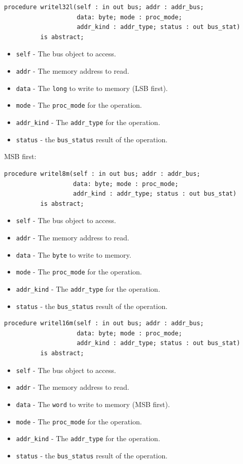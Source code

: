 \documentclass[10pt, openany]{book}
\newcommand{\keyword}[1]{\texttt{#1}}
\newcommand{\datatype}[1]{\texttt{#1}}
\begin{document}
\begin{lstlisting}
procedure writel32l(self : in out bus; addr : addr_bus;
                    data: byte; mode : proc_mode;
                    addr_kind : addr_type; status : out bus_stat)
          is abstract;
\end{lstlisting}
\begin{itemize}
  \item \keyword{self} - The bus object to access.
  \item \keyword{addr} - The memory address to read.
  \item \keyword{data} - The \datatype{long} to write to memory (LSB first).
  \item \keyword{mode} - The \datatype{proc\_mode} for the operation.
  \item \keyword{addr\_kind} - The \datatype{addr\_type} for the operation.
  \item \keyword{status} - the \datatype{bus\_status} result of the operation.
\end{itemize}

MSB first:
\begin{lstlisting}
procedure writel8m(self : in out bus; addr : addr_bus;
                   data: byte; mode : proc_mode;
                   addr_kind : addr_type; status : out bus_stat)
          is abstract;
\end{lstlisting}
\begin{itemize}
  \item \keyword{self} - The bus object to access.
  \item \keyword{addr} - The memory address to read.
  \item \keyword{data} - The \datatype{byte} to write to memory.
  \item \keyword{mode} - The \datatype{proc\_mode} for the operation.
  \item \keyword{addr\_kind} - The \datatype{addr\_type} for the operation.
  \item \keyword{status} - the \datatype{bus\_status} result of the operation.
\end{itemize}

\begin{lstlisting}
procedure writel16m(self : in out bus; addr : addr_bus;
                    data: byte; mode : proc_mode;
                    addr_kind : addr_type; status : out bus_stat)
          is abstract;
\end{lstlisting}
\begin{itemize}
  \item \keyword{self} - The bus object to access.
  \item \keyword{addr} - The memory address to read.
  \item \keyword{data} - The \datatype{word} to write to memory (MSB first).
  \item \keyword{mode} - The \datatype{proc\_mode} for the operation.
  \item \keyword{addr\_kind} - The \datatype{addr\_type} for the operation.
  \item \keyword{status} - the \datatype{bus\_status} result of the operation.
\end{itemize}
\end{document}

